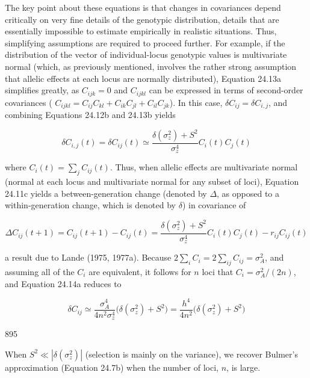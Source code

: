 \documentclass{article}
\begin{document}
The key point about these equations is that changes in covariances depend critically on very fine details of the genotypic distribution, details that are essentially impossible to estimate empirically in realistic situations. Thus, simplifying assumptions are required to proceed further. For example, if the distribution of the vector of individual-locus genotypic values is multivariate normal (which, as previously mentioned, involves the rather strong assumption that allelic effects at each locus are normally distributed), Equation 24.13a simplifies greatly, as  $ C_{ijk} = 0 $ and  $ C_{ijkl} $ can be expressed in terms of second-order covariances ( $ C_{ijkl} = C_{ij}C_{kl} + C_{ik}C_{jl} + C_{il}C_{jk} $). In this case,  $ \delta C_{ij} = \delta C_{i,j} $, and combining Equations 24.12b and 24.13b yields

\begin{equation}
\delta C_{i,j}(t)=\delta C_{ij}(t)\simeq\frac{\delta(\sigma_{z}^{2})+S^{2}}{\sigma_{z}^{4}}C_{i}(t)C_{j}(t)
\tag{24.14a}
\label{eq:24_14a}
\end{equation}

where  $ C_i(t) = \sum_j C_{ij}(t) $. Thus, when allelic effects are multivariate normal (normal at each locus and multivariate normal for any subset of loci), Equation 24.11c yields a between-generation change (denoted by  $ \Delta $, as opposed to a within-generation change, which is denoted by  $ \delta $) in covariance of

\begin{equation}
\Delta C_{ij}(t+1)=C_{ij}(t+1)-C_{ij}(t)=\frac{\delta(\sigma_{z}^{2})+S^{2}}{\sigma_{z}^{4}}C_{i}(t)C_{j}(t)-r_{ij}C_{ij}(t)
\tag{24.14b}
\label{eq:24_14b}
\end{equation}

a result due to Lande (1975, 1977a). Because  $ 2 \sum_i C_i = 2 \sum_{ij} C_{ij} = \sigma_A^2 $, and assuming all of the  $ C_i $ are equivalent, it follows for  $ n $ loci that  $ C_i = \sigma_A^2 / (2n) $, and Equation 24.14a reduces to

\begin{equation}
\delta C_{ij}\simeq\frac{\sigma_{A}^{4}}{4n^{2}\sigma_{z}^{4}}\bigg(\delta(\sigma_{z}^{2})+S^{2}\bigg)=\frac{h^{4}}{4n^{2}}\bigg(\delta(\sigma_{z}^{2})+S^{2}\bigg)
\tag{24.14c}
\label{eq:24_14c}
\end{equation}

895

When  $ S^2 \ll |\delta(\sigma_z^2)| $ (selection is mainly on the variance), we recover Bulmer’s approximation (Equation 24.7b) when the number of loci,  $ n $, is large.
\end{document}
